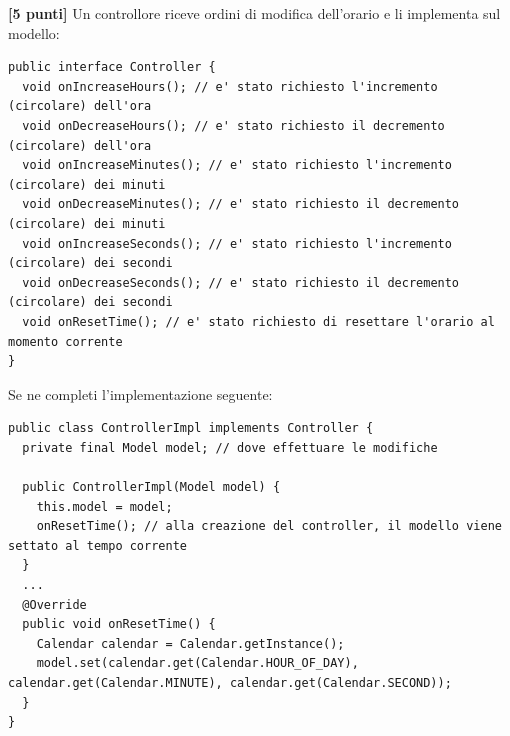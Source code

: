 \documentclass{article}[10pt]
\newcounter{esnu}
\newenvironment{esercizio}{\medskip \noindent {\bf Esercizio\addtocounter{esnu}{1} \arabic{esnu}}}{}
\begin{document}
\begin{esercizio}
\textbf{[5 punti]}
Un controllore riceve ordini di modifica dell'orario e li implementa sul modello:

{\scriptsize\begin{verbatim}
public interface Controller {
  void onIncreaseHours(); // e' stato richiesto l'incremento (circolare) dell'ora
  void onDecreaseHours(); // e' stato richiesto il decremento (circolare) dell'ora
  void onIncreaseMinutes(); // e' stato richiesto l'incremento (circolare) dei minuti
  void onDecreaseMinutes(); // e' stato richiesto il decremento (circolare) dei minuti
  void onIncreaseSeconds(); // e' stato richiesto l'incremento (circolare) dei secondi
  void onDecreaseSeconds(); // e' stato richiesto il decremento (circolare) dei secondi
  void onResetTime(); // e' stato richiesto di resettare l'orario al momento corrente
}
\end{verbatim}}

\noindent
Se ne completi l'implementazione seguente:

{\scriptsize\begin{verbatim}
public class ControllerImpl implements Controller {
  private final Model model; // dove effettuare le modifiche

  public ControllerImpl(Model model) {
    this.model = model;
    onResetTime(); // alla creazione del controller, il modello viene settato al tempo corrente
  }
  ...
  @Override
  public void onResetTime() {
    Calendar calendar = Calendar.getInstance();
    model.set(calendar.get(Calendar.HOUR_OF_DAY), calendar.get(Calendar.MINUTE), calendar.get(Calendar.SECOND));
  }
}
\end{verbatim}}
\end{esercizio}
\end{document}

